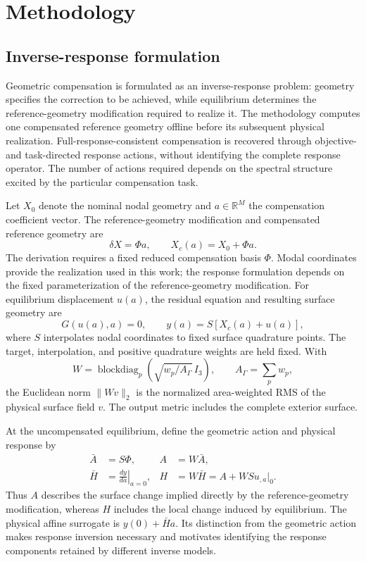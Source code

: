 \section{Methodology}
\label{sec:methodology}

\subsection{Inverse-response formulation}
\label{sec:inverse_response_formulation}

Geometric compensation is formulated as an inverse-response problem: geometry specifies the correction to be achieved, while equilibrium determines the reference-geometry modification required to realize it. The methodology computes one compensated reference geometry offline before its subsequent physical realization. Full-response-consistent compensation is recovered through objective- and task-directed response actions, without identifying the complete response operator. The number of actions required depends on the spectral structure excited by the particular compensation task.

Let \(X_0\) denote the nominal nodal geometry and \(a\in\mathbb R^M\) the compensation coefficient vector. The reference-geometry modification and compensated reference geometry are
\begin{equation}
\delta X=\Phi a,
\qquad
X_c(a)=X_0+\Phi a.
\label{eq:compensated_reference_geometry}
\end{equation}
The derivation requires a fixed reduced compensation basis \(\Phi\). Modal coordinates provide the realization used in this work; the response formulation depends on the fixed parameterization of the reference-geometry modification. For equilibrium displacement \(u(a)\), the residual equation and resulting surface geometry are
\[
G(u(a),a)=0,
\qquad
y(a)=S[X_c(a)+u(a)],
\]
where \(S\) interpolates nodal coordinates to fixed surface quadrature points. The target, interpolation, and positive quadrature weights are held fixed. With
\[
W=\operatorname{blockdiag}_p\!\left(
\sqrt{w_p/A_\Gamma}\,I_3\right),
\qquad
A_\Gamma=\sum_p w_p,
\]
the Euclidean norm \(\|Wv\|_2\) is the normalized area-weighted RMS of the physical surface field \(v\). The output metric includes the complete exterior surface.

At the uncompensated equilibrium, define the geometric action and physical response by
\begin{equation}
\begin{aligned}
\bar A&=S\Phi, & A&=W\bar A,\\
\bar H&=\left.\frac{dy}{da}\right|_{a=0},
& H&=W\bar H=A+WSu_{,a}|_0.
\end{aligned}
\label{eq:geometric_and_physical_response}
\end{equation}
Thus \(A\) describes the surface change implied directly by the reference-geometry modification, whereas \(H\) includes the local change induced by equilibrium. The physical affine surrogate is \(y(0)+\bar H a\). Its distinction from the geometric action makes response inversion necessary and motivates identifying the response components retained by different inverse models.

